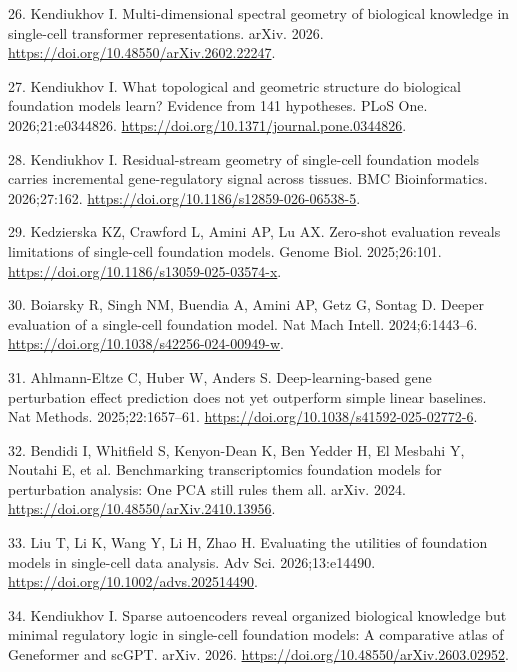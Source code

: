 \documentclass[
  11pt,
]{article}
\newlength{\cslhangindent}
\newenvironment{CSLReferences}[2] %
 {\begin{list}{}{%
  \setlength{\itemindent}{0pt}
  \setlength{\leftmargin}{0pt}
  \setlength{\parsep}{0pt}
  \ifodd #1
   \setlength{\leftmargin}{\cslhangindent}
   \setlength{\itemindent}{-1\cslhangindent}
  \fi
  \setlength{\itemsep}{#2\baselineskip}}}
 {\end{list}}
\begin{document}
\begin{CSLReferences}{0}{1}
26. Kendiukhov I. Multi-dimensional spectral geometry of biological
knowledge in single-cell transformer representations. arXiv. 2026.
\url{https://doi.org/10.48550/arXiv.2602.22247}.

27. Kendiukhov I. What topological and geometric structure do biological
foundation models learn? {Evidence} from 141 hypotheses. PLoS One.
2026;21:e0344826. \url{https://doi.org/10.1371/journal.pone.0344826}.

28. Kendiukhov I. Residual-stream geometry of single-cell foundation
models carries incremental gene-regulatory signal across tissues. BMC
Bioinformatics. 2026;27:162.
\url{https://doi.org/10.1186/s12859-026-06538-5}.

29. Kedzierska KZ, Crawford L, Amini AP, Lu AX. Zero-shot evaluation
reveals limitations of single-cell foundation models. Genome Biol.
2025;26:101. \url{https://doi.org/10.1186/s13059-025-03574-x}.

30. Boiarsky R, Singh NM, Buendia A, Amini AP, Getz G, Sontag D. Deeper
evaluation of a single-cell foundation model. Nat Mach Intell.
2024;6:1443--6. \url{https://doi.org/10.1038/s42256-024-00949-w}.

31. Ahlmann-Eltze C, Huber W, Anders S. Deep-learning-based gene
perturbation effect prediction does not yet outperform simple linear
baselines. Nat Methods. 2025;22:1657--61.
\url{https://doi.org/10.1038/s41592-025-02772-6}.

32. Bendidi I, Whitfield S, Kenyon-Dean K, Ben Yedder H, El Mesbahi Y,
Noutahi E, et al. Benchmarking transcriptomics foundation models for
perturbation analysis: One {PCA} still rules them all. arXiv. 2024.
\url{https://doi.org/10.48550/arXiv.2410.13956}.

33. Liu T, Li K, Wang Y, Li H, Zhao H. Evaluating the utilities of
foundation models in single-cell data analysis. Adv Sci. 2026;13:e14490.
\url{https://doi.org/10.1002/advs.202514490}.

34. Kendiukhov I. Sparse autoencoders reveal organized biological
knowledge but minimal regulatory logic in single-cell foundation models:
A comparative atlas of {Geneformer} and {scGPT}. arXiv. 2026.
\url{https://doi.org/10.48550/arXiv.2603.02952}.


\end{CSLReferences}
\end{document}
